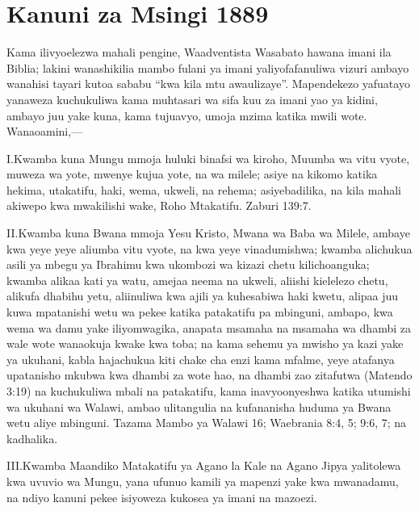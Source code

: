 

 \label{chap:appendix}






\section*{Kanuni za Msingi 1889}


Kama ilivyoelezwa mahali pengine, Waadventista Wasabato hawana imani ila Biblia; lakini wanashikilia mambo fulani ya imani yaliyofafanuliwa vizuri ambayo wanahisi tayari kutoa sababu “kwa kila mtu awaulizaye”. Mapendekezo yafuatayo yanaweza kuchukuliwa kama muhtasari wa sifa kuu za imani yao ya kidini, ambayo juu yake kuna, kama tujuavyo, umoja mzima katika mwili wote. Wanaoamini,—



\lettrine{I.} Kwamba kuna Mungu mmoja huluki binafsi wa kiroho, Muumba wa vitu vyote, muweza wa yote, mwenye kujua yote, na wa milele; asiye na kikomo katika hekima, utakatifu, haki, wema, ukweli, na rehema; asiyebadilika, na kila mahali akiwepo kwa mwakilishi wake, Roho Mtakatifu. Zaburi 139:7.


\lettrine{II.} Kwamba kuna Bwana mmoja Yesu Kristo, Mwana wa Baba wa Milele, ambaye kwa yeye yeye aliumba vitu vyote, na kwa yeye vinadumishwa; kwamba alichukua asili ya mbegu ya Ibrahimu kwa ukombozi wa kizazi chetu kilichoanguka; kwamba alikaa kati ya watu, amejaa neema na ukweli, aliishi kielelezo chetu, alikufa dhabihu yetu, aliinuliwa kwa ajili ya kuhesabiwa haki kwetu, alipaa juu kuwa mpatanishi wetu wa pekee katika patakatifu pa mbinguni, ambapo, kwa wema wa damu yake iliyomwagika, anapata msamaha na msamaha wa dhambi za wale wote wanaokuja kwake kwa toba; na kama sehemu ya mwisho ya kazi yake ya ukuhani, kabla hajachukua kiti chake cha enzi kama mfalme, yeye atafanya upatanisho mkubwa kwa dhambi za wote hao, na dhambi zao zitafutwa (Matendo 3:19) na kuchukuliwa mbali na patakatifu, kama inavyoonyeshwa katika utumishi wa ukuhani wa Walawi, ambao ulitangulia na kufananisha huduma ya Bwana wetu aliye mbinguni. Tazama Mambo ya Walawi 16; Waebrania 8:4, 5; 9:6, 7; na kadhalika.


\lettrine{III.} Kwamba Maandiko Matakatifu ya Agano la Kale na Agano Jipya yalitolewa kwa uvuvio wa Mungu, yana ufunuo kamili ya mapenzi yake kwa mwanadamu, na ndiyo kanuni pekee isiyoweza kukosea ya imani na mazoezi.


